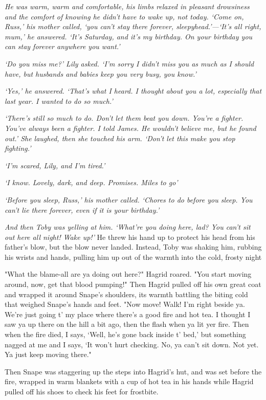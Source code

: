 \emph{He was warm, warm and comfortable, his limbs relaxed in pleasant drowsiness and the comfort of knowing he didn't have to wake up, not today. `Come on, Russ,' his mother called, `you can't stay there forever, sleepyhead.'—`It's all right, mum,' he answered. `It's Saturday, and it's my birthday. On your birthday you can stay forever anywhere you want.'}

\emph{`Do you miss me?' Lily asked. `I'm sorry I didn't miss you as much as I should have, but husbands and babies keep you very busy, you know.'}

\emph{`Yes,' he answered. `That's what I heard. I thought about you a lot, especially that last year. I wanted to do so much.'}

\emph{`There's still so much to do. Don't let them beat you down. You're a fighter. You've always been a fighter. I told James. He wouldn't believe me, but he found out.' She laughed, then she touched his arm. `Don't let this make you stop fighting.'}

\emph{`I'm scared, Lily, and I'm tired.'}

\emph{`I know. Lovely, dark, and deep. Promises. Miles to go{\el}'}

\emph{`Before you sleep, Russ,' his mother called. `Chores to do before you sleep. You can't lie there forever, even if it is your birthday.'}

\emph{And then Toby was yelling at him. `What're you doing here, lad? You can't sit out here all night! Wake up!'} He threw his hand up to protect his head from his father's blow, but the blow never landed. Instead, Toby was shaking him, rubbing his wrists and hands, pulling him up out of the warmth into the cold, frosty night{\el}

"What the blame-all are ya doing out here?" Hagrid roared. "You start moving around, now, get that blood pumping!" Then Hagrid pulled off his own great coat and wrapped it around Snape's shoulders, its warmth battling the biting cold that weighed Snape's hands and feet. "Now move! Walk! I'm right beside ya. We're just going t' my place where there's a good fire and hot tea. I thought I saw ya up there on the hill a bit ago, then the flash when ya lit yer fire. Then when the fire died, I says, `Well, he's gone back inside t' bed,' but something nagged at me and I says, `It won't hurt checking. No, ya can't sit down. Not yet. Ya just keep moving there."

Then Snape was staggering up the steps into Hagrid's hut, and was set before the fire, wrapped in warm blankets with a cup of hot tea in his hands while Hagrid pulled off his shoes to check his feet for frostbite.

